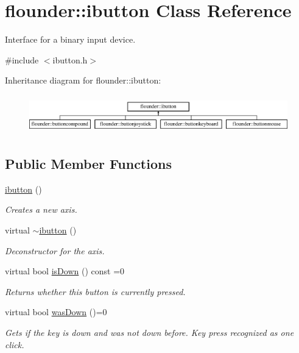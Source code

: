 \hypertarget{classflounder_1_1ibutton}{}\section{flounder\+:\+:ibutton Class Reference}
\label{classflounder_1_1ibutton}


Interface for a binary input device.  




{\ttfamily \#include $<$ibutton.\+h$>$}

Inheritance diagram for flounder\+:\+:ibutton\+:\begin{figure}[H]
\begin{center}
\leavevmode
\includegraphics[height=1.696970cm]{classflounder_1_1ibutton}
\end{center}
\end{figure}
\subsection*{Public Member Functions}
\begin{DoxyCompactItemize}
\item 
\hyperlink{classflounder_1_1ibutton_a76aa7e3a4cc57c267ef8380462e9c2b6}{ibutton} ()
\begin{DoxyCompactList}\small\item\em Creates a new axis. \end{DoxyCompactList}\item 
virtual \hyperlink{classflounder_1_1ibutton_aff254102cfa10ee61da7801c2027ac43}{$\sim$ibutton} ()
\begin{DoxyCompactList}\small\item\em Deconstructor for the axis. \end{DoxyCompactList}\item 
virtual bool \hyperlink{classflounder_1_1ibutton_af99b936d7329f74a27768ce6eb181327}{is\+Down} () const =0
\begin{DoxyCompactList}\small\item\em Returns whether this button is currently pressed. \end{DoxyCompactList}\item 
virtual bool \hyperlink{classflounder_1_1ibutton_a5fb7b3493c0ea0e67bb9defc272da0d3}{was\+Down} ()=0
\begin{DoxyCompactList}\small\item\em Gets if the key is down and was not down before. Key press recognized as one click. \end{DoxyCompactList}\end{DoxyCompactItemize}


